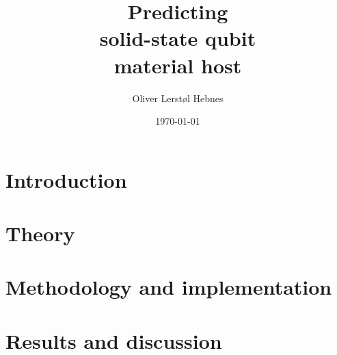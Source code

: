 \documentclass[twoside, english, notitlepage, 12pt]{uiofysmaster}
\author{Oliver Lerstøl Hebnes}
\title{Predicting\\
solid-state qubit\\
material host
}
\date{\today}
\begin{document}
\hypersetup{pageanchor=false}
\frontmatter
    \maketitle



    \setcounter{tocdepth}{2}
    \tableofcontents

\mainmatter
    \part{Introduction}
      

    \part{Theory}
        

    \part{Methodology and implementation}

        

    \part{Results and discussion}

      
      
      
\end{document}
